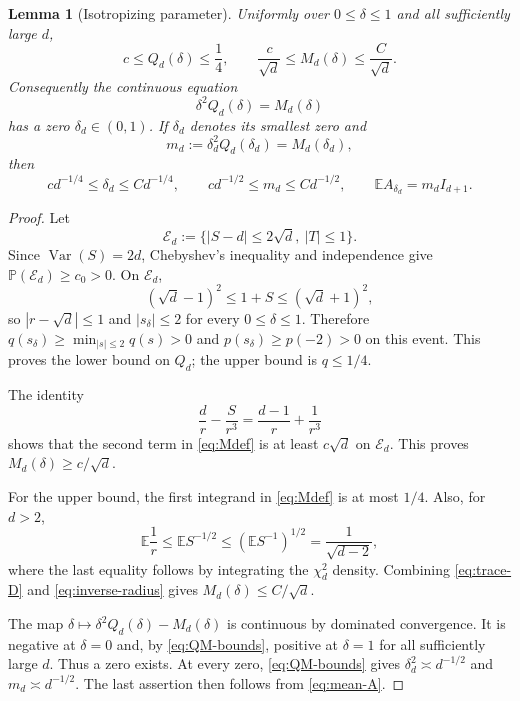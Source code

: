 \documentclass[11pt]{article}
\numberwithin{equation}{section}
\newtheorem{lemma}[theorem]{Lemma}
\newcommand{\E}{\mathbb E}
\begin{document}
\begin{lemma}[Isotropizing parameter]\label{lem:delta}
Uniformly over $0\le\delta\le1$ and all sufficiently large $d$,
\begin{equation}\label{eq:QM-bounds}
  c\le Q_d(\delta)\le\frac14,
  \qquad
  \frac c{\sqrt d}\le M_d(\delta)\le\frac C{\sqrt d}.
\end{equation}
Consequently the continuous equation
\begin{equation}\label{eq:isotropizing-equation}
  \delta^2Q_d(\delta)=M_d(\delta)
\end{equation}
has a zero $\delta_d\in(0,1)$.  If $\delta_d$ denotes its smallest zero and
\begin{equation}\label{eq:mdef}
  m_d:=\delta_d^2Q_d(\delta_d)=M_d(\delta_d),
\end{equation}
then
\begin{equation}\label{eq:delta-m-scale}
  c d^{-1/4}\le\delta_d\le C d^{-1/4},
  \qquad
  c d^{-1/2}\le m_d\le C d^{-1/2},
  \qquad
  \E A_{\delta_d}=m_dI_{d+1}.
\end{equation}
\end{lemma}

\begin{proof}
Let
\[
  \mathcal E_d:=\{|S-d|\le2\sqrt d,\ |T|\le1\}.
\]
Since $\operatorname{Var}(S)=2d$, Chebyshev's inequality and independence
give $\mathbb P(\mathcal E_d)\ge c_0>0$.  On $\mathcal E_d$,
\[
  (\sqrt d-1)^2\le1+S\le(\sqrt d+1)^2,
\]
so $|r-\sqrt d|\le1$ and $|s_\delta|\le2$ for every
$0\le\delta\le1$.  Therefore $q(s_\delta)\ge\min_{|s|\le2}q(s)>0$ and
$p(s_\delta)\ge p(-2)>0$ on this event.  This proves the lower bound on
$Q_d$; the upper bound is $q\le1/4$.

The identity
\begin{equation}\label{eq:trace-D}
  \frac d r-\frac S{r^3}=\frac{d-1}{r}+\frac1{r^3}
\end{equation}
shows that the second term in \eqref{eq:Mdef} is at least $c\sqrt d$ on
$\mathcal E_d$.  This proves $M_d(\delta)\ge c/\sqrt d$.

For the upper bound, the first integrand in \eqref{eq:Mdef} is at most
$1/4$.  Also, for $d>2$,
\begin{equation}\label{eq:inverse-radius}
  \E\frac1r
  \le\E S^{-1/2}
  \le(\E S^{-1})^{1/2}
  =\frac1{\sqrt{d-2}},
\end{equation}
where the last equality follows by integrating the $\chi_d^2$ density.
Combining \eqref{eq:trace-D} and \eqref{eq:inverse-radius} gives
$M_d(\delta)\le C/\sqrt d$.

The map $\delta\mapsto\delta^2Q_d(\delta)-M_d(\delta)$ is continuous by
dominated convergence.  It is negative at $\delta=0$ and, by
\eqref{eq:QM-bounds}, positive at $\delta=1$ for all sufficiently large $d$.
Thus a zero exists.  At every zero, \eqref{eq:QM-bounds} gives
$\delta_d^2\asymp d^{-1/2}$ and $m_d\asymp d^{-1/2}$.  The last assertion
then follows from \eqref{eq:mean-A}.
\end{proof}
\end{document}
